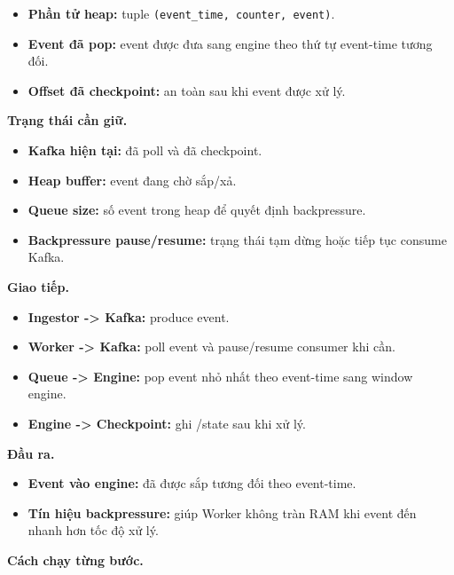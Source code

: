 \documentclass[12pt,a4paper]{article}
\begin{document}
\begin{itemize}
\item \textbf{Phần tử heap:} tuple \texttt{(event\_time, counter, event)}.
\item \textbf{Event đã pop:} event được đưa sang engine theo thứ tự event-time tương đối.
\item \textbf{Offset đã checkpoint:}  an toàn sau khi event được xử lý.
\end{itemize}
\textbf{Trạng thái cần giữ.}

\begin{itemize}
\item \textbf{Kafka  hiện tại:}  đã poll và  đã checkpoint.
\item \textbf{Heap buffer:} event đang chờ sắp/xả.
\item \textbf{Queue size:} số event trong heap để quyết định backpressure.
\item \textbf{Backpressure pause/resume:} trạng thái tạm dừng hoặc tiếp tục consume Kafka.
\end{itemize}
\textbf{Giao tiếp.}

\begin{itemize}
\item \textbf{Ingestor -> Kafka:} produce event.
\item \textbf{Worker -> Kafka:} poll event và pause/resume consumer khi cần.
\item \textbf{Queue -> Engine:} pop event nhỏ nhất theo event-time sang window engine.
\item \textbf{Engine -> Checkpoint:} ghi /state sau khi xử lý.
\end{itemize}
\textbf{Đầu ra.}

\begin{itemize}
\item \textbf{Event vào engine:} đã được sắp tương đối theo event-time.
\item \textbf{Tín hiệu backpressure:} giúp Worker không tràn RAM khi event đến nhanh hơn tốc độ xử lý.
\end{itemize}
\textbf{Cách chạy từng bước.}
\end{document}

